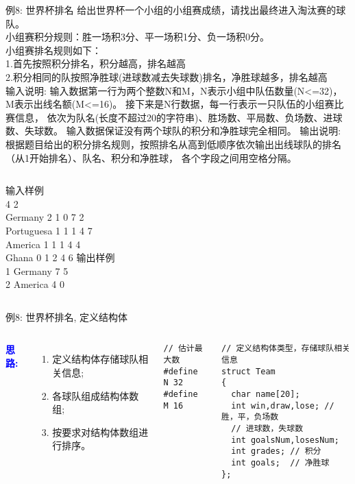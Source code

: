 \begin{frame}{例8: 世界杯排名}
给出世界杯一个小组的小组赛成绩，请找出最终进入淘汰赛的球队。 \\
小组赛积分规则：胜一场积3分、平一场积1分、负一场积0分。 \\
小组赛排名规则如下： \\
1.首先按照积分排名，积分越高，排名越高\\ 
2.积分相同的队按照净胜球(进球数减去失球数)排名，净胜球越多，排名越高\\ 
输入说明: 输入数据第一行为两个整数N和M，N表示小组中队伍数量(N<=32)，M表示出线名额(M<=16)。
接下来是N行数据，每一行表示一只队伍的小组赛比赛信息，
依次为队名(长度不超过20的字符串)、胜场数、平局数、负场数、进球数、失球数。
输入数据保证没有两个球队的积分和净胜球完全相同。
输出说明: 根据题目给出的积分排名规则，按照排名从高到低顺序依次输出出线球队的排名（从1开始排名）、队名、积分和净胜球，
各个字段之间用空格分隔。\\
\begin{columns}[T]
	输入样例\\	
	4 2\\ 
	Germany 2	1	0	7	2 \\
	Portuguesa 1	1	1	4	7 \\
	America 1	1	1	4	4 \\
	Ghana 0	1	2	4	6 
	输出样例\\	
	1 Germany	7 5 \\
	2 America 4 0 
\end{columns}
\medskip
\end{frame}

\begin{frame}{例8: 世界杯排名, 定义结构体}
\begin{columns}[T]
\textbf{\textcolor{blue}{思路:}}
\begin{enumerate}
	\item 定义结构体存储球队相关信息;
	\item 各球队组成结构体数组;
	\item 按要求对结构体数组进行排序。
\end{enumerate}
\begin{lstlisting}
// 估计最大数 
#define N 32
#define M 16
\end{lstlisting}
\begin{lstlisting}
// 定义结构体类型，存储球队相关信息 
struct Team
{
  char name[20];
  int win,draw,lose; // 胜，平，负场数 
  // 进球数，失球数
  int goalsNum,losesNum; 
  int grades; // 积分
  int goals;  // 净胜球  
};
\end{lstlisting}
\end{columns}
\end{frame}

